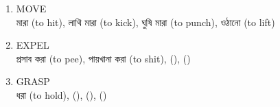 \documentclass[11pt,a4paper,twocolumn]{article}
\begin{document}
{\begin{enumerate}
		\item MOVE\\
		\textcolor{hlit}{মারা} (to hit), \textcolor{hlit}{লাথি মারা} (to kick), 
		\textcolor{hlit}{ঘুষি মারা} (to punch), \textcolor{hlit}{ওঠানো} (to lift)\\
		
		\item EXPEL\\
		\textcolor{hlit}{প্রসাব করা} (to pee), \textcolor{hlit}{পায়খানা করা} (to shit), 
		\textcolor{hlit}{}(), \textcolor{hlit}{}()\\
		
		\item GRASP\\
		\textcolor{hlit}{ধরা} (to hold), \textcolor{hlit}{}(), 
		\textcolor{hlit}{}(), \textcolor{hlit}{}()\\
			
	
	\end{enumerate}
	
	}
\end{document}
